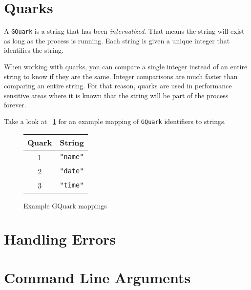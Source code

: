\section{Quarks}

A \verb|GQuark| is a string that has been \emph{internalized}.
That means the string will exist as long as the process is running.
Each string is given a unique integer that identifies the string.

When working with quarks, you can compare a single integer instead of an entire string to know if they are the same.
Integer comparisons are much faster than comparing an entire string.
For that reason, quarks are used in performance sensitive areas where it is known that the string will be part of the process forever.

Take a look at ~\ref{fig:quarks} for an example mapping of \verb|GQuark| identifiers to strings.

\begin{figure}[h!]
\centering
\begin{tabular}{c | l}
Quark & String \\
\hline
1 & \verb|"name"| \\
2 & \verb|"date"| \\
3 & \verb|"time"| \\
\end{tabular}
\caption{Example GQuark mappings}
\label{fig:quarks}
\end{figure}

\section{Handling Errors}

\section{Command Line Arguments}
